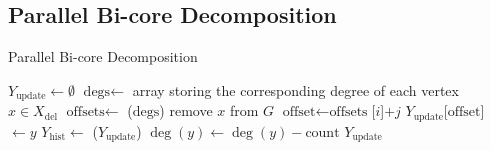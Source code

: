 
\subsection{Parallel Bi-core Decomposition}
\label{sec:par-decomp}
\begin{algorithm}[t!]
 \footnotesize
\caption{Parallel Bi-core Decomposition}
 \begin{algorithmic}[1]
 
 \State {}
 \EndParFor
 \State {}
 \EndParFor
 \EndProcedure

 \State $Y_\text{update}\leftarrow \emptyset$
 \State $\text{degs}\leftarrow$ array storing the corresponding degree of each vertex $x\in X_\text{del}$ 
 \State $\text{offsets}\leftarrow$ ($\text{degs}$)
 \State remove $x$ from $G$
 \State $\text{offset}\leftarrow \text{offsets}$[$i$]$+j$ 
 \State $Y_\text{update}$[$\text{offset}$] $\leftarrow y$ 
 \EndParFor
 \EndParFor
 \State $Y_\text{hist} \leftarrow $ ($Y_\text{update}$) 
 \State $\deg(y) \leftarrow \deg(y)-\text{count}$ 
 \EndParFor
 \State \Return $Y_\text{update}$
 \EndProcedure


\end{algorithmic}
\end{algorithm}
